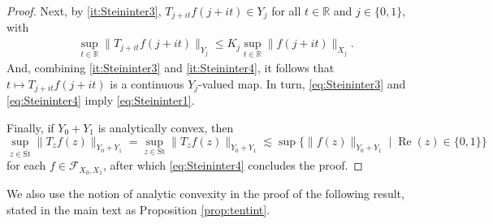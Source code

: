 \documentclass{amsart}
\newcommand {\F}{\mathcal{F}}
\newcommand {\R}{\mathbb R}
\newcommand {\St}{{\mathrm{St}}}
\DeclareMathOperator{\Real}{Re}
\theoremstyle{definition}
\numberwithin{equation}{section}
\begin{document}
\begin{proof}
Next, by \eqref{it:Steininter3}, $T_{j+it}f(j+it)\in Y_{j}$ for all $t\in\R$ and $j\in\{0,1\}$, with
\begin{equation}\label{eq:Steininter4}
\begin{aligned}
&\sup_{t\in\R}\|T_{j+it}f(j+it)\|_{Y_{j}}\leq K_{j}\sup_{t\in\R}\|f(j+it)\|_{X_{j}}.
\end{aligned}
\end{equation}
And, combining \eqref{it:Steininter3} and \eqref{it:Steininter4}, it follows that $t\mapsto T_{j+it}f(j+it)$ is a continuous $Y_{j}$-valued map. In turn, \eqref{eq:Steininter3} and \eqref{eq:Steininter4} imply \eqref{eq:Steininter1}. %

Finally, if $Y_{0}+Y_{1}$ is analytically convex, then
\[
\sup_{z\in\overline{\St}}\|T_{z}f(z)\|_{Y_{0}+Y_{1}}=\sup_{z\in\St}\|T_{z}f(z)\|_{Y_{0}+Y_{1}}\lesssim \sup\{\|f(z)\|_{Y_{0}+Y_{1}}\mid \Real(z)\in\{0,1\}\}
\]
for each $f\in\F_{X_{0},X_{1}}$, after which \eqref{eq:Steininter4} concludes the proof. 
\end{proof}



We also use the notion of analytic convexity in the proof of the following result, stated in the main text as Proposition \ref{prop:tentint}.
\end{document}
